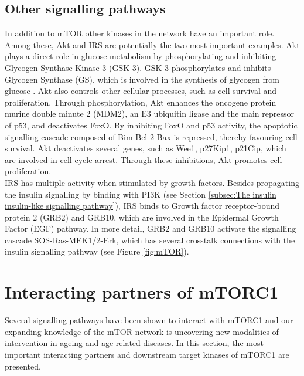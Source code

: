 \subsection{Other signalling pathways}
\label{subsec:Other signalling pathways}
In addition to mTOR other kinases in the network have an important role. Among these, Akt and IRS are potentially the two most important examples. Akt plays a direct role in glucose metabolism by phosphorylating and inhibiting Glycogen Synthase Kinase 3 (GSK-3). GSK-3 phosphorylates and inhibits Glycogen Synthase (GS), which is involved in the synthesis of glycogen from glucose \citep{Embi1980}. Akt also controls other cellular processes, such as cell survival and proliferation. Through phosphorylation, Akt enhances the oncogene protein murine double minute 2 (MDM2), an E3 ubiquitin ligase and the main repressor of p53, and deactivates FoxO. By inhibiting FoxO and p53 activity, the apoptotic signalling cascade composed of Bim-Bcl-2-Bax is repressed, thereby favouring cell survival. Akt deactivates several genes, such as Wee1, p27Kip1, p21Cip, which are involved in cell cycle arrest. Through these inhibitions, Akt promotes cell proliferation.\\
IRS has multiple activity when stimulated by growth factors. Besides propagating the insulin signalling by binding with PI3K (see Section \ref{subsec:The insulin insulin-like signalling pathway}), IRS binds to Growth factor receptor-bound protein 2 (GRB2) and GRB10, which are involved in the Epidermal Growth Factor (EGF) pathway. In more detail, GRB2 and GRB10 activate the signalling cascade SOS-Ras-MEK1/2-Erk, which has several crosstalk connections with the insulin signalling pathway (see Figure \ref{fig:mTOR}).


\section{Interacting partners of mTORC1}
\label{sec:Interacting partners of mTORC1}
Several signalling pathways have been shown to interact with mTORC1 and our expanding knowledge of the mTOR network is uncovering new modalities of intervention in ageing and age-related diseases. In this section, the most important interacting partners and downstream target kinases of mTORC1 are presented.

